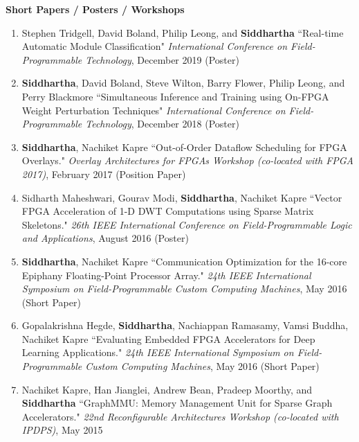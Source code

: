 \documentclass[10pt]{article}
\begin{document}
\textbf{\large Short Papers / Posters / Workshops}
\begin{enumerate}
    \item Stephen Tridgell, David Boland, Philip Leong, and {\bf Siddhartha} ``Real-time Automatic Module Classification" \emph{International Conference on Field-Programmable Technology}, December 2019 (Poster)
    \item {\bf Siddhartha}, David Boland, Steve Wilton, Barry Flower, Philip Leong, and Perry Blackmore ``Simultaneous Inference and Training using On-FPGA Weight Perturbation Techniques" \emph{International Conference on Field-Programmable Technology}, December 2018 (Poster)
    \item {\bf Siddhartha}, Nachiket Kapre ``Out-of-Order Dataflow Scheduling for FPGA Overlays." \emph{Overlay Architectures for FPGAs Workshop (co-located with FPGA 2017)}, February 2017 (Position Paper)
    \item Sidharth Maheshwari, Gourav Modi, {\bf Siddhartha}, Nachiket Kapre ``Vector FPGA Acceleration of 1-D DWT Computations using Sparse Matrix Skeletons." \emph{26th IEEE International Conference on Field-Programmable Logic and Applications}, August 2016 (Poster)
    \item {\bf Siddhartha}, Nachiket Kapre ``Communication Optimization for the 16-core Epiphany Floating-Point Processor Array." \emph{24th IEEE International Symposium on Field-Programmable Custom Computing Machines}, May 2016 (Short Paper)
    \item Gopalakrishna Hegde, {\bf Siddhartha}, Nachiappan Ramasamy, Vamsi Buddha, Nachiket Kapre ``Evaluating Embedded FPGA Accelerators for Deep Learning Applications." \emph{24th IEEE International Symposium on Field-Programmable Custom Computing Machines}, May 2016 (Short Paper)
    \item Nachiket Kapre, Han Jianglei, Andrew Bean, Pradeep Moorthy, and {\bf Siddhartha} ``GraphMMU: Memory Management Unit for Sparse Graph Accelerators." \emph{22nd Reconfigurable Architectures Workshop (co-located with IPDPS)}, May 2015

\end{enumerate}
\end{document}
